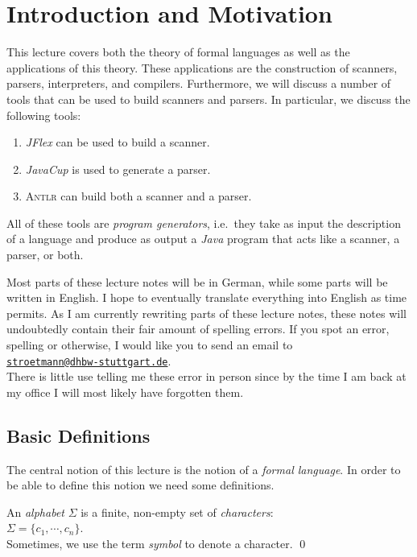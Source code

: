 \chapter{Introduction and Motivation}
This lecture covers both the theory of formal languages as well as the applications of this theory.
These applications are the construction of scanners, parsers, interpreters, and compilers.  Furthermore, we
will discuss a number of tools that can be used to build scanners and parsers.  In particular, we
discuss the following tools:
\begin{enumerate}
\item \textsl{JFlex} can be used to build a scanner.
\item \textsl{JavaCup} is used to generate a parser.
\item \textsc{Antlr} can build both a scanner and a parser.
\end{enumerate}
All of these tools are \emph{program generators}, i.e.~they take as input the description of a
language and produce as output a \textsl{Java} program that acts like a scanner, a parser, or both. 

Most parts of these lecture notes will be in German, while some parts will be written in English.
I hope to eventually translate everything into English as time permits.  As I am currently rewriting
parts of these lecture notes, these notes will undoubtedly contain their fair amount of spelling
errors.  If you spot an error, spelling or otherwise, I would like you to send an email to
\\[0.2cm]
\hspace*{1.3cm}
\href{mailto:stroetmann@dhbw-stuttgart.de}{\texttt{stroetmann@dhbw-stuttgart.de}}.
\\[0.2cm]
There is little use telling me these error in person since by the time I am back at my office I will
most likely have forgotten them.


\section{Basic Definitions}
The central notion of this lecture is the notion of a \emph{formal language}.
In order to be able to define this notion we need some definitions. 


\begin{Definition}[Alphabet]
An \emph{alphabet} $\Sigma$ is a finite, non-empty set of \emph{characters}:
\\[0.2cm]
\hspace*{1.3cm}
$\Sigma = \{ c_1, \cdots, c_n \}$. 
\\[0.2cm]
Sometimes, we use the term \emph{symbol} to denote a character.
\qed
\end{Definition}

